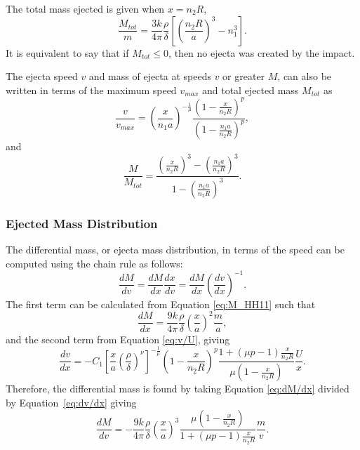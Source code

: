 \documentclass{article}
\begin{document}
The total mass ejected is given when $x = n_2 R$,
\begin{equation}\label{eq:Mtot}
\frac{M_{tot}}{m} = \frac{3k}{4\pi}\frac{\rho}{\delta}\left[\left(\frac{n_2 R}{a}\right)^3-n_1^3\right].
\end{equation}
It is equivalent to say that if $M_{tot} \le 0$, then no ejecta was created by the impact.

The ejecta speed $v$ and mass of ejecta at speeds $v$ or greater $M$, can also be written in terms of the maximum speed $v_{max}$ and total ejected mass $M_{tot}$ as
\begin{equation}\label{eq:v/v_max}
\frac{v}{v_{max}} = \left(\frac{x}{n_1 a}\right)^{-\frac{1}{\mu}}\frac{\left(1-\frac{x}{n_2 R}\right)^p}{\left(1-\frac{n_1 a}{n_2 R}\right)^p},
\end{equation}
and
\begin{equation}\label{M/M_tot}
\frac{M}{M_{tot}} = \frac{\left(\frac{x}{n_2 R}\right)^3 - \left(\frac{n_1 a}{n_2 R}\right)^3}{1 - \left(\frac{n_1 a}{n_2 R}\right)^3}.
\end{equation}
\subsubsection{Ejected Mass Distribution}

The differential mass, or ejecta mass distribution, in terms of the speed can be computed using the chain rule as follows:
\begin{equation}\label{eq:dM/dv chain rule}
\frac{dM}{dv} = \frac{dM}{dx}\frac{dx}{dv} = \frac{dM}{dx}\left(\frac{dv}{dx}\right)^{-1}.
\end{equation}
The first term can be calculated from Equation \eqref{eq:M_HH11} such that
\begin{equation}\label{eq:dM/dx}
\frac{dM}{dx} = \frac{9k}{4\pi}\frac{\rho}{\delta}\left(\frac{x}{a}\right)^2\frac{m}{a},
\end{equation}
and the second term from Equation \eqref{eq:v/U}, giving
\begin{equation}\label{eq:dv/dx}
\frac{dv}{dx} = -C_1\left[\frac{x}{a}\left(\frac{\rho}{\delta}\right)^\nu\right]^{-\frac{1}{\mu}}\left(1 - \frac{x}{n_2 R}\right)^p
\frac{1+(\mu p -1)\frac{x}{n_2 R}}{\mu\left(1-\frac{x}{n_2 R}\right)}\frac{U}{x}.
\end{equation}
Therefore, the differential mass is found by taking Equation \eqref{eq:dM/dx} divided by Equation~\eqref{eq:dv/dx} giving
\begin{equation}\label{eq:dM/dv final}
\frac{dM}{dv} = -\frac{9k}{4\pi}\frac{\rho}{\delta}\left(\frac{x}{a}\right)^3\frac{\mu\left(1-\frac{x}{n_2 R}\right)}{1+(\mu p-1)\frac{x}{n_2 R}}\frac{m}{v}.
\end{equation}
\end{document}
